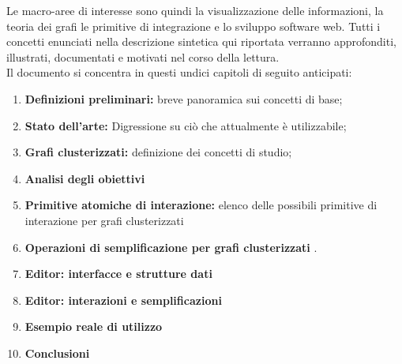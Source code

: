 Le macro-aree di interesse sono quindi la visualizzazione delle informazioni, la teoria dei grafi le primitive di integrazione e lo sviluppo software web. Tutti i concetti enunciati nella descrizione sintetica qui riportata verranno approfonditi, illustrati, documentati e motivati nel corso della lettura.\\
Il documento si concentra in questi undici capitoli di seguito anticipati:\\
\begin{enumerate}
	\item \textbf{Definizioni preliminari:} breve panoramica sui concetti di base;
	\item \textbf{Stato dell'arte:} Digressione su ciò che attualmente è utilizzabile;
	\item \textbf{Grafi clusterizzati:} definizione dei concetti di studio;
	\item \textbf{Analisi degli obiettivi}
	\item \textbf{Primitive atomiche di interazione:} elenco delle possibili primitive di interazione per grafi clusterizzati
	\item \textbf{Operazioni di semplificazione per grafi clusterizzati }.
	\item \textbf{Editor: interfacce e strutture dati}
	\item \textbf{Editor: interazioni e semplificazioni}
	\item \textbf{Esempio reale di utilizzo }
	\item \textbf{Conclusioni}
\end{enumerate}
